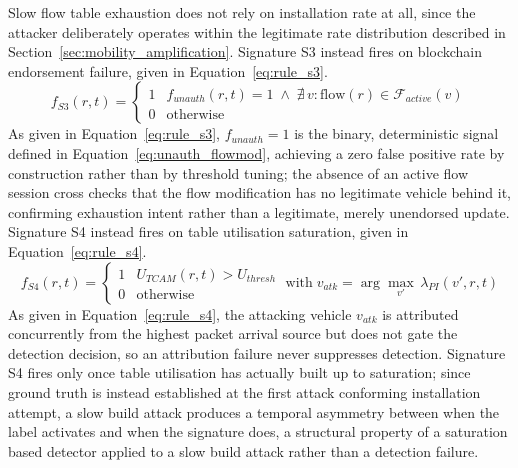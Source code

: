 \documentclass[final,5p,twocolumn]{elsarticle}
\theoremstyle{remark}
\theoremstyle{plain}
\begin{document}
Slow flow table exhaustion does not rely on installation rate at all, since
the attacker deliberately operates within the legitimate rate distribution
described in Section~\ref{sec:mobility_amplification}. Signature S3 instead
fires on blockchain endorsement failure, given in
Equation~\eqref{eq:rule_s3}.
\begin{equation}
	f_{S3}(r,t) =
	\begin{cases}
		1 & f_{unauth}(r,t) = 1 \;\land\; \nexists\, v : \text{flow}(r) \in \mathcal{F}_{active}(v) \\
		0 & \text{otherwise}
	\end{cases}
	\label{eq:rule_s3}
\end{equation}
As given in Equation~\eqref{eq:rule_s3}, $f_{unauth} = 1$ is the binary,
deterministic signal defined in Equation~\eqref{eq:unauth_flowmod}, achieving
a zero false positive rate by construction rather than by threshold tuning;
the absence of an active flow session cross checks that the flow
modification has no legitimate vehicle behind it, confirming exhaustion
intent rather than a legitimate, merely unendorsed update. Signature S4
instead fires on table utilisation saturation, given in
Equation~\eqref{eq:rule_s4}.
\begin{equation}
	f_{S4}(r,t) =
	\begin{cases}
		1 & U_{TCAM}(r,t) > U_{thresh} \\
		0 & \text{otherwise}
	\end{cases}
	\;\text{with}\;
	v_{atk} = \arg\max_{v'}\, \lambda_{PI}(v',r,t)
	\label{eq:rule_s4}
\end{equation}
As given in Equation~\eqref{eq:rule_s4}, the attacking vehicle $v_{atk}$ is
attributed concurrently from the highest packet arrival source but does not
gate the detection decision, so an attribution failure never suppresses
detection. Signature S4 fires only once table utilisation has actually
built up to saturation; since ground truth is instead established at the
first attack conforming installation attempt, a slow build attack produces a
temporal asymmetry between when the label activates and when the signature
does, a structural property of a saturation based detector applied to a
slow build attack rather than a detection failure.
\end{document}
